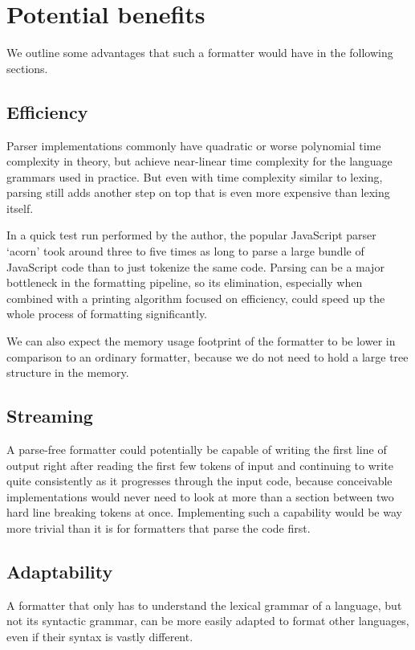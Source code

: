 \section{Potential benefits}
We outline some advantages that such a formatter would have in the following sections.

\subsection{Efficiency}
Parser implementations commonly have quadratic or worse polynomial time complexity in theory,
but achieve near-linear time complexity for the language grammars used in practice.
\autocite{antlrLlStar} \autocite{antlrAllStar}
But even with time complexity similar to lexing,
parsing still adds another step on top that is even more expensive than lexing itself.

In a quick test run performed by the author, the popular JavaScript parser `acorn' \autocite{acorn}
took around three to five times as long to parse a large bundle of JavaScript code
than to just tokenize the same code.
Parsing can be a major bottleneck in the formatting pipeline,
so its elimination, especially when combined with a printing algorithm focused on efficiency,
could speed up the whole process of formatting significantly.

We can also expect the memory usage footprint of the formatter
to be lower in comparison to an ordinary formatter,
because we do not need to hold a large tree structure in the memory.

\subsection{Streaming}
A parse-free formatter could potentially be capable of writing the first line of output
right after reading the first few tokens of input and continuing to write quite consistently
as it progresses through the input code, because conceivable implementations would never
need to look at more than a section between two hard line breaking tokens at once.
Implementing such a capability would be way more trivial than it is for
formatters that parse the code first.

\subsection{Adaptability}
A formatter that only has to understand the lexical grammar of a language,
but not its syntactic grammar, can be more easily adapted to format other languages,
even if their syntax is vastly different.

